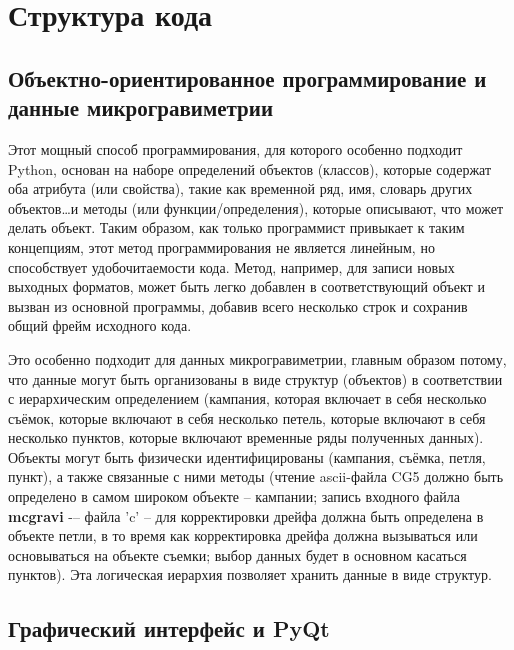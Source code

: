 \chapter[Структура кода]{Структура кода}
\label{chap:code_structure}

\section[Объектно-ориентированное программирование и данные микрогравиметрии]{Объектно-ориентированное программирование и данные микрогравиметрии}
\label{sec:object-oriented programming_and_microgravity_data}

Этот мощный способ программирования, для которого особенно подходит Python,
основан на наборе определений объектов (классов), которые содержат оба атрибута
(или свойства), такие как временной ряд, имя, словарь других объектов\dots и
методы (или функции/определения), которые описывают, что может делать объект.
Таким образом, как только программист привыкает к таким концепциям, этот метод
программирования не является линейным, но способствует удобочитаемости кода.
Метод, например, для записи новых выходных форматов, может быть легко добавлен в
соответствующий объект и вызван из основной программы, добавив всего несколько
строк и сохранив общий фрейм исходного кода.

Это особенно подходит для данных микрогравиметрии, главным образом потому, что
данные могут быть организованы в виде структур (объектов) в соответствии с
иерархическим определением (кампания, которая включает в себя несколько съёмок,
которые включают в себя несколько петель, которые включают в себя несколько
пунктов, которые включают временные ряды полученных данных). Объекты могут быть
физически идентифицированы (кампания, съёмка, петля, пункт), а также связанные с
ними методы (чтение ascii-файла CG5 должно быть определено в самом широком
объекте -- кампании; запись входного файла \textbf{\textsf{mcgravi}} -– файла
'c' -- для корректировки дрейфа должна быть определена в объекте петли, в то
время как корректировка дрейфа должна вызываться или основываться на объекте
съемки; выбор данных будет в основном касаться пунктов). Эта логическая иерархия
позволяет хранить данные в виде структур.

\section[Графический интерфейс и PyQt]{Графический интерфейс и PyQt}
\label{sec:gui_and_pyqt}

